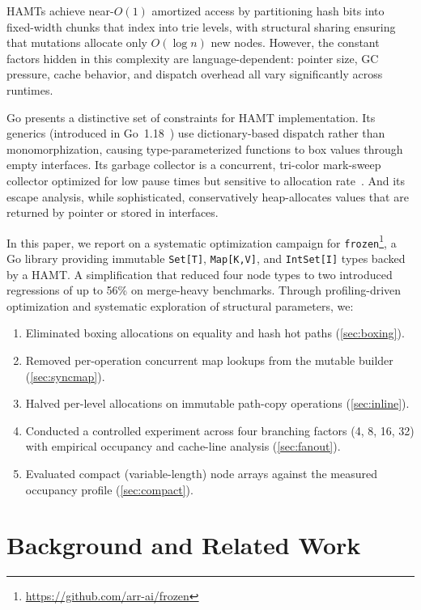 \documentclass[11pt,twocolumn]{article}
\begin{document}
HAMTs achieve near-$O(1)$ amortized access by partitioning hash bits into
fixed-width chunks that index into trie levels, with structural sharing
ensuring that mutations allocate only $O(\log n)$ new nodes.
However, the constant factors hidden in this complexity are
language-dependent: pointer size, GC pressure, cache behavior, and dispatch
overhead all vary significantly across runtimes.

Go presents a distinctive set of constraints for HAMT implementation.
Its generics (introduced in Go~1.18~\cite{go118}) use dictionary-based
dispatch rather than monomorphization, causing type-parameterized functions
to box values through empty interfaces.
Its garbage collector is a concurrent, tri-color mark-sweep collector
optimized for low pause times but sensitive to allocation
rate~\cite{hudson2018}.
And its escape analysis, while sophisticated, conservatively heap-allocates
values that are returned by pointer or stored in interfaces.

In this paper, we report on a systematic optimization campaign for
\texttt{frozen}\footnote{\url{https://github.com/arr-ai/frozen}}, a Go
library providing immutable \texttt{Set[T]}, \texttt{Map[K,V]}, and
\texttt{IntSet[I]} types backed by a HAMT.
A simplification that reduced four node types to two introduced regressions
of up to 56\% on merge-heavy benchmarks.
Through profiling-driven optimization and systematic exploration of
structural parameters, we:

\begin{enumerate}[nosep]
  \item Eliminated boxing allocations on equality and hash hot paths
        (\cref{sec:boxing}).
  \item Removed per-operation concurrent map lookups from the mutable
        builder (\cref{sec:syncmap}).
  \item Halved per-level allocations on immutable path-copy operations
        (\cref{sec:inline}).
  \item Conducted a controlled experiment across four branching factors
        (4, 8, 16, 32) with empirical occupancy and cache-line analysis
        (\cref{sec:fanout}).
  \item Evaluated compact (variable-length) node arrays against the
        measured occupancy profile (\cref{sec:compact}).
\end{enumerate}

\section{Background and Related Work}
\label{sec:related}
\end{document}
